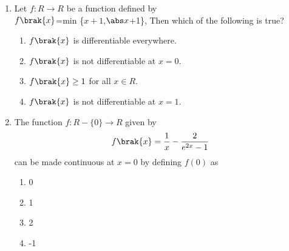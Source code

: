 \documentclass[journal,12pt,onecolumn]{IEEEtran}
\theoremstyle{remark}
\begin{document}
\begin{enumerate}
    \item Let $f:R \to R$ be a function defined by\\$f\brak{x}$=min \{$x+1$,$\abs x$+1\}, Then which of the following is true? 
      \hfill{}
     \begin{enumerate}
     \item $f\brak{x}$ is differentiable everywhere.\item $f\brak{x}$ is not differentiable at $x=0$.\item $f\brak{x} \geq1$ for all $x\in R$.\item $f\brak{x}$ is not differentiable at $x=1$.
     \end{enumerate}
    \item The function $f:R-\{0\}\to R$ given by
    \begin{align*}
        f\brak{x}=\frac{1}{x}-\frac{2}{e^{2x}-1}
    \end{align*} can be made continuous at $x=0$ by defining $f(0)$ as \hfill{}
     \begin{multicols}{4}
         \begin{enumerate}
     \item 0\item1\item 2\item -1
     \end{enumerate}
     \end{multicols}
     

\end{enumerate}
\end{document}
